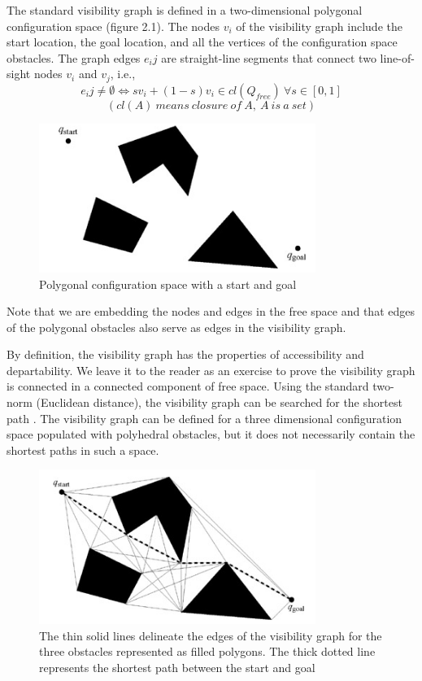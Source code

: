 \documentclass[11pt]{article}
\begin{document}
The standard visibility graph is defined in a two-dimensional polygonal configuration space (figure 2.1). The nodes $v_i$ of the visibility graph include the start location, the goal location, and all the vertices of the configuration space obstacles. The graph edges $e_ij$ are straight-line segments that connect two line-of-sight nodes $v_i$ and $v_j$, i.e.,
$$e_ij \ne \emptyset \Longleftrightarrow sv_i + (1-s)v_i \in cl(Q_{free})\   \forall s \in [0,1] $$
$$(cl(A)\ means\ closure\ of\ A,\ A\ is\ a\ set)$$
\begin{figure}[h]
\centering
\includegraphics[width=9cm]{imgs/Polygonal_configuration_space.png}
\caption{Polygonal configuration space with a start and goal}
\end{figure}

Note that we are embedding the nodes and edges in the free space and that edges of the polygonal obstacles also serve as edges in the visibility graph.

By definition, the visibility graph has the properties of accessibility and departability. We leave it to the reader as an exercise to prove the visibility graph is connected in a connected component of free space. Using the standard two-norm (Euclidean distance), the visibility graph can be searched for the shortest path . The visibility graph can be defined for a three dimensional configuration space populated with polyhedral obstacles, but it does not necessarily contain the shortest paths in such a space.\\

\begin{figure}[h]
  \centering
  \includegraphics[width=9cm]{imgs/shortest_path.png}
  \caption{The thin solid lines delineate the edges of the visibility graph for the three obstacles represented as filled polygons. The thick dotted line represents the shortest path between the start and goal}
\end{figure}
\end{document}
